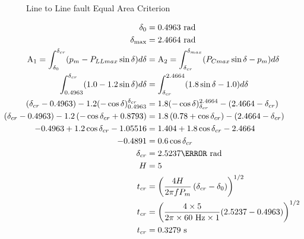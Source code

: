 \documentclass[main.tex]{subfiles}
\begin{document}
\begin{enumerate}
\begin{figure}
\centering{}
\caption{Line to Line fault Equal Area Criterion}
\label{fig:24a_b}
\end{figure}

$$
\begin{aligned}
\delta_0&=0.4963 \text{~rad} \\
\delta_{\mathrm{max}} &= 2.4664 \text{~rad}\\
\mathrm{A}_1=\int_{\delta_0}^{\delta_{cr}} (p_m - P_{LLmax} \sin \delta) d\delta 
&= \mathrm{A}_2 = \int_{\delta_{cr}}^{\delta_{max}} (P_{Cmax} \sin \delta - p_m) d \delta \\
\int_{0.4963}^{\delta_{cr}} (1.0 - 1.2 \sin \delta) d\delta &= \int_{\delta_{cr}}^{2.4664}(1.8 \sin \delta-1.0) d \delta \\
(\delta_{cr} - 0.4963) - 1.2(-\cos \delta)_{0.4963}^{\delta_{cr}} &= 1.8(-\cos \delta)_{\delta_{c r}}^{2.4664}-\left(2.4664-\delta_{c r}\right) \\
\left(\delta_{cr} - 0.4963\right) - 1.2\left(-\cos \delta_{cr} + 0.8793 \right) &= 1.8\left(0.78 + \cos \delta_{cr}\right) - \left(2.4664-\delta_{cr}\right) \\
-0.4963 + 1.2 \cos \delta_{cr} - 1.05516 &= 1.404 + 1.8 \cos \delta_{cr} - 2.4664 \\
-0.4891 &= 0.6 \cos \delta_{c r} \\
\delta_{c r} &= 2.5237 \radian \mathrm{~rad} \\
H &= 5\\
t_{cr} &= \left(\frac{4 H}{2\pi f P_m} \left(\delta_{cr}-\delta_0\right) \right)^{1 / 2} \\
t_{cr} &= \left(\frac{4 \times 5}{2\pi \times 60 \mathrm{~Hz} \times 1} (2.5237-0.4963) \right)^{1 / 2} \\
t_{cr} &= 0.3279 \mathrm{~s} 
\end{aligned}
$$

\end{enumerate}
\end{document}
